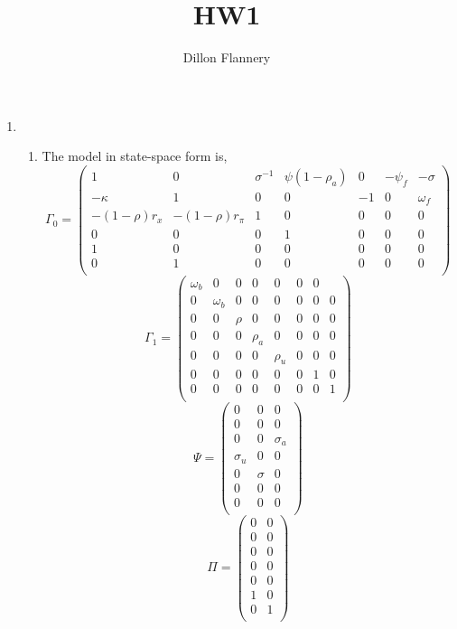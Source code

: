 \documentclass[]{article}
\title{HW1}
\author{Dillon Flannery}
\begin{document}
\maketitle
\begin{enumerate}
	\item 
	\begin{enumerate}
	\item The model in state-space form is, 
	\[  
	\Gamma_0=\begin{pmatrix}
	1 & 0 & \sigma^{-1} & \psi(1-\rho_a) & 0 & -\psi_f & -\sigma \\
	-\kappa & 1 & 0 & 0 & -1 & 0 & \omega_f \\ 
	-(1-\rho)r_x & -(1-\rho)r_{\pi} & 1 & 0 & 0 & 0& 0 \\
	0 & 0 & 0& 1 &  0 & 0 & 0 \\
	1 & 0 & 0 & 0& 0 & 0 & 0 \\
	0 & 1 & 0 & 0& 0 & 0 & 0 \\
	\end{pmatrix}
	\]
	\[
	\Gamma_1 = \begin{pmatrix}
	\omega_b &  0 & 0 & 0& 0 & 0 & 0 \\
	0 &  \omega_b & 0 & 0 & 0& 0 & 0 & 0 \\
	0 &  0 & \rho & 0 & 0& 0 & 0 & 0 \\
	0 &  0 & 0 & \rho_a & 0& 0 & 0 & 0 \\
	0 &  0 & 0 & 0 & \rho_u& 0 & 0 & 0 \\
	0 &  0 & 0 & 0 & 0& 0 & 1 & 0 \\
	0 &  0 & 0 & 0 & 0& 0 & 0 & 1 \\
	\end{pmatrix}
	  \]
	\[
	\Psi = \begin{pmatrix}
	0 & 0 & 0 \\
	0 & 0 & 0 \\
	0 & 0 & \sigma_a \\
	\sigma_u & 0 & 0 \\
	0 & \sigma & 0 \\
	0 & 0 & 0 \\
	0 & 0 & 0 \\
	\end{pmatrix}
	\]
	\[
	\Pi = \begin{pmatrix}
	0 & 0 \\
	0& 0 \\
0& 0 \\
0& 0 \\
0& 0 \\
1 & 0 \\
0 & 1 \\	

\end{pmatrix}\]
\end{enumerate}
\end{enumerate}
\end{document}
